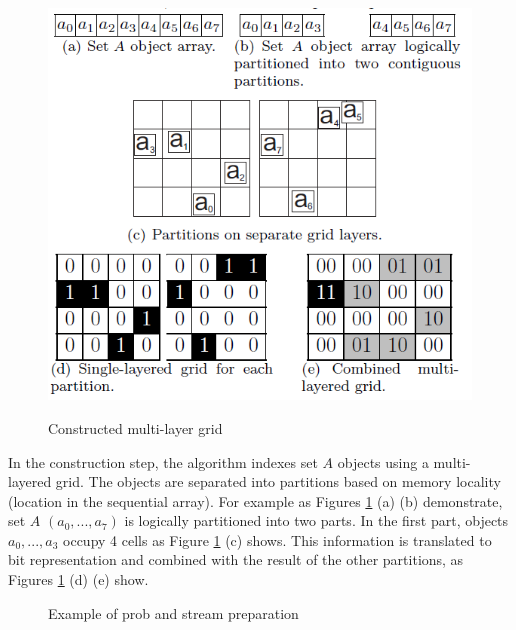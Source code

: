 \documentclass[paper=a4, fontsize=18pt]{article} %
\numberwithin{equation}{section} %
\numberwithin{figure}{section} %
\numberwithin{table}{section} %
\begin{document}
\begin{figure}[h]
  \centering
  \includegraphics[width=.6\linewidth]{8_8_mlg1.png}\\
  \caption{Constructed multi-layer grid}\label{fig:MLG1}
\end{figure}


In the construction step, the algorithm indexes set $A$ objects using a multi-layered grid. The objects are separated into partitions based on memory locality (location in the sequential array). For example as Figures \ref{fig:MLG1} (a) (b) demonstrate, set $A$ $(a_0,..., a_7)$ is logically partitioned into two parts. In the first part, objects $a_0,...,a_3$ occupy 4 cells as Figure \ref{fig:MLG1} (c) shows. This information is translated to bit representation and combined with the result of the other partitions, as Figures \ref{fig:MLG1} (d) (e) show.

\begin{figure}[h]
  \centering
  \caption{Example of prob and stream preparation}\label{fig:MLG2}
\end{figure}
\end{document}
